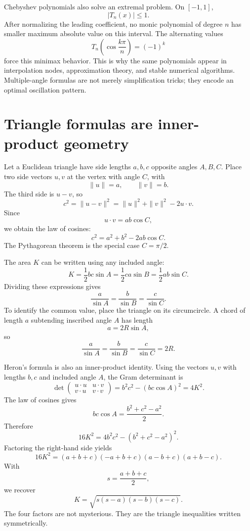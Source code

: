 Chebyshev polynomials also solve an extremal problem.  On \([-1,1]\),
\[
  |T_n(x)|\le1.
\]
After normalizing the leading coefficient, no monic polynomial of degree \(n\) has smaller maximum absolute value on this interval.  The alternating values
\[
  T_n\left(\cos\frac{k\pi}{n}\right)=(-1)^k
\]
force this minimax behavior.  This is why the same polynomials appear in interpolation nodes, approximation theory, and stable numerical algorithms.  Multiple-angle formulas are not merely simplification tricks; they encode an optimal oscillation pattern.

\section{Triangle formulas are inner-product geometry}

Let a Euclidean triangle have side lengths \(a,b,c\) opposite angles \(A,B,C\).  Place two side vectors \(u,v\) at the vertex with angle \(C\), with
\[
  \|u\|=a,
  \qquad
  \|v\|=b.
\]
The third side is \(u-v\), so
\[
  c^2=\|u-v\|^2
  =\|u\|^2+\|v\|^2-2u\cdot v.
\]
Since
\[
  u\cdot v=ab\cos C,
\]
we obtain the law of cosines:
\[
  \boxed{c^2=a^2+b^2-2ab\cos C.}
\]
The Pythagorean theorem is the special case \(C=\pi/2\).

The area \(K\) can be written using any included angle:
\[
  K=\frac12bc\sin A
   =\frac12ca\sin B
   =\frac12ab\sin C.
\]
Dividing these expressions gives
\[
  \frac{a}{\sin A}
  =\frac{b}{\sin B}
  =\frac{c}{\sin C}.
\]
To identify the common value, place the triangle on its circumcircle.  A chord of length \(a\) subtending inscribed angle \(A\) has length
\[
  a=2R\sin A,
\]
so
\[
  \boxed{
  \frac{a}{\sin A}
  =\frac{b}{\sin B}
  =\frac{c}{\sin C}
  =2R.}
\]

Heron's formula is also an inner-product identity.  Using the vectors \(u,v\) with lengths \(b,c\) and included angle \(A\), the Gram determinant is
\[
  \det
  \begin{pmatrix}
    u\cdot u&u\cdot v\\
    v\cdot u&v\cdot v
  \end{pmatrix}
  =b^2c^2-(bc\cos A)^2
  =4K^2.
\]
The law of cosines gives
\[
  bc\cos A=\frac{b^2+c^2-a^2}{2}.
\]
Therefore
\[
  16K^2
  =4b^2c^2-(b^2+c^2-a^2)^2.
\]
Factoring the right-hand side yields
\[
  16K^2
  =(a+b+c)(-a+b+c)(a-b+c)(a+b-c).
\]
With
\[
  s=\frac{a+b+c}{2},
\]
we recover
\[
  \boxed{K=\sqrt{s(s-a)(s-b)(s-c)}.}
\]
The four factors are not mysterious.  They are the triangle inequalities written symmetrically.


